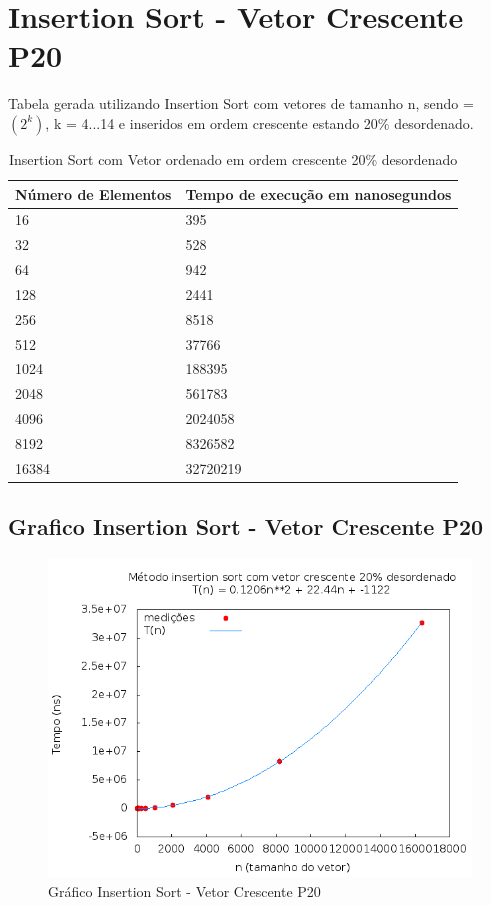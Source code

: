 \documentclass[12pt,a4paper,twoside]{report}
\begin{document}
\section{Insertion Sort - Vetor Crescente P20}
Tabela gerada utilizando Insertion Sort com vetores de tamanho n, sendo = $(2^k)$, k = 4...14 e inseridos em ordem crescente estando 20\% desordenado.

\begin{table}[H]
\centering
\caption{Insertion Sort com Vetor ordenado em ordem crescente 20\% desordenado}
\label{my-label}
\begin{tabular}{|l|l|}
\hline
\multicolumn{1}{|c|}{\textbf{Número de Elementos}} & \multicolumn{1}{c|}{\textbf{Tempo de execução em nanosegundos}} \\ \hline
16 & 395 \\ \hline
32 & 528 \\ \hline
64 & 942 \\ \hline
128 & 2441 \\ \hline
256 & 8518 \\ \hline
512 & 37766 \\ \hline
1024 & 188395 \\ \hline
2048 & 561783 \\ \hline
4096 & 2024058 \\ \hline
8192 & 8326582 \\ \hline
16384 & 32720219 \\ \hline
\end{tabular}
\end{table}

\subsection{Grafico Insertion Sort - Vetor Crescente P20}
\begin{figure}[H]
    \centering
    \includegraphics[width=0.7\linewidth]{graficos/Insertion/vIntCrescenteP20/vIntCrescenteP20.png}
  \caption{Gráfico Insertion Sort - Vetor Crescente P20}
\end{figure}
\end{document}
